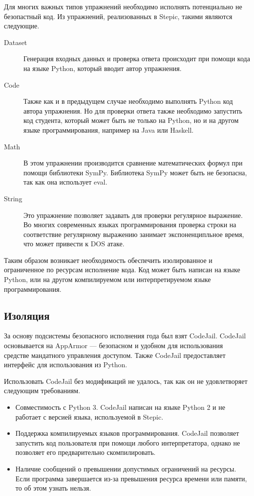 \documentclass{matmex-diploma-custom}
\begin{document}
Для многих важных типов упражнений необходимо исполнять потенциально
не безопастный код. Из упражнений, реализованных в Stepic, такими
являются следующие.
\begin{description}
\item[Dataset] Генерация входных данных и проверка ответа происходит
  при помощи кода на языке Python, который вводит автор упражнения.
\item[Code] Также как и в предыдущем случае необходимо выполнять
  Python код автора упражнения. Но для проверки ответа также
  необходимо запустить код студента, который может быть не только на
  Python, но и на другом языке программирования, например на Java или
  Haskell.
\item[Math] В этом упражнении производится сравнение математических
  формул при помощи библиотеки SymPy. Библиотека SymPy может быть не
  безопасна, так как она использует eval.
\item[String] Это упражнение позволяет задавать для проверки
  регулярное выражение. Во многих современных языках программирования
  проверка строки на соответствие регулярному выражению занимает
  экспоненципльное время, что может привести к DOS атаке.
\end{description}

Таким образом возникает необходимость обеспечить изолированное
и ограниченное по ресурсам исполнение кода. Код может быть написан на
языке Python, или на другом компилируемом или интерпретируемом
языке программирования.

\subsection{Изоляция}
За основу подсистемы безопасного исполнения года был взят
CodeJail. CodeJail основывается на AppArmor --- безопасном \cite{Bauer} и удобном
для использования \cite{Schreuders} средстве мандатного управления
доступом. Также CodeJail предоставляет интерфейс для использования из
Python.

Использовать CodeJail без модификаций не удалось, так как он не
удовлетворяет следующим требованиям.

\begin{itemize}
\item Совместимость с Python 3. CodeJail написан на языке Python 2 и
  не работает с версией языка, используемой в Stepic.
\item Поддержка компилируемых языков программирования. CodeJail
  позволяет запустить код пользователя при помощи любого
  интерпретатора, однако не позволяет его предварительно
  скомпилировать.
\item Наличие сообщений о превышении допустимых ограничений на
  ресурсы. Если программа завершается из-за превышения ресурса времени
  или памяти, то об этом узнать нельзя.
\end{itemize}
\end{document}
